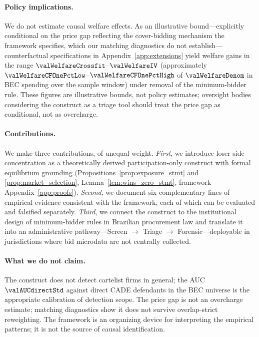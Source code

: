 \paragraph{Policy implications.}
We do not estimate causal welfare effects. As an illustrative
bound---explicitly conditional on the price gap reflecting the
cover-bidding mechanism the framework specifies, which our matching
diagnostics do not establish---counterfactual specifications in
Appendix~\ref{app:extensions} yield welfare gains in the range
$\valWelfareCrossfit$--$\valWelfareIV$ (approximately $\valWelfareCFOnePctLow$--$\valWelfareCFOnePctHigh$
of $\valWelfareDenom$ in BEC spending over the sample window) under
removal of the minimum-bidder rule.
These figures are illustrative bounds, not policy estimates;
oversight bodies considering the construct as a triage tool should
treat the price gap as conditional, not as overcharge.

\paragraph{Contributions.}
We make three contributions, of unequal weight. \emph{First}, we
introduce loser-side concentration as a theoretically derived
participation-only construct with formal equilibrium grounding
(Propositions~\ref{prop:exposure_stmt} and \ref{prop:market_selection},
Lemma~\ref{lem:wins_zero_stmt}, framework Appendix~\ref{app:proofs}).
\emph{Second}, we document six complementary lines of empirical evidence
consistent with the framework, each of which can be evaluated and
falsified separately. \emph{Third}, we connect the construct to the
institutional design of minimum-bidder rules in Brazilian procurement
law and translate it into an administrative pathway---Screen $\to$
Triage $\to$ Forensic---deployable in jurisdictions where bid microdata
are not centrally collected.

\paragraph{What we do not claim.}
The construct does not detect cartelist firms in general; the AUC
$\valAUCdirectStd$ against direct CADE defendants in the BEC universe is
the appropriate calibration of detection scope. The price gap is not
an overcharge estimate; matching diagnostics show it does not survive
overlap-strict reweighting. The framework is an organizing device for
interpreting the empirical patterns; it is not the source of causal
identification.

